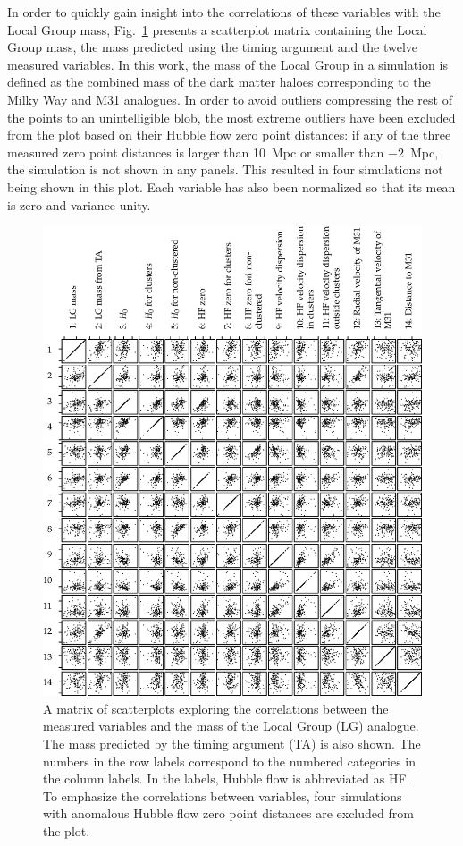 \documentclass[english, oneside]{HYgradu}
\begin{document}
In order to quickly gain insight into the correlations of these variables with the Local Group mass, Fig.~\ref{fig:pca-scattermatrix} presents a scatterplot matrix containing the Local Group mass, the mass predicted using the timing argument and the twelve measured variables. In this work, the mass of the Local Group in a simulation is defined as the combined mass of the dark matter haloes corresponding to the Milky Way and M31 analogues. In order to avoid outliers compressing the rest of the points to an unintelligible blob, the most extreme outliers have been excluded from the plot based on their Hubble flow zero point distances: if any of the three measured zero point distances is larger than 10~Mpc or smaller than $-2$~Mpc, the simulation is not shown in any panels. This resulted in four simulations not being shown in this plot. Each variable has also been normalized so that its mean is zero and variance unity.

\begin{figure}
    \centering
    \includegraphics{kuvat/PCA/scattermatrix-tightOutlierCriteria.pdf}
    \caption{A matrix of scatterplots exploring the correlations between the measured variables and the mass of the Local Group (LG) analogue. The mass predicted by the timing argument (TA) is also shown. The numbers in the row labels correspond to the numbered categories in the column labels. In the labels, Hubble flow is abbreviated as HF. To emphasize the correlations between variables, four simulations with anomalous Hubble flow zero point distances are excluded from the plot.}\label{fig:pca-scattermatrix}
\end{figure}
\end{document}
